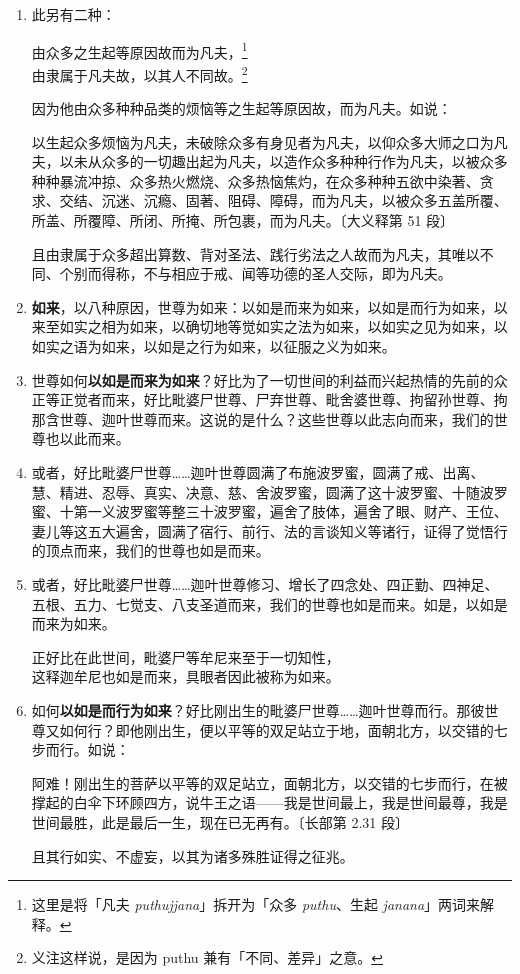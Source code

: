 \begin{enumerate}
\item 此另有二种：\begin{quoting}由众多之生起等原因故而为凡夫，\footnote{这里是将「凡夫 \textit{puthujjana}」拆开为「众多 \textit{puthu}、生起 \textit{janana}」两词来解释。}\\由隶属于凡夫故，以其人不同故。\footnote{义注这样说，是因为 puthu 兼有「不同、差异」之意。}\end{quoting}因为他由众多种种品类的烦恼等之生起等原因故，而为凡夫。如说：\begin{quoting}以生起众多烦恼为凡夫，未破除众多有身见者为凡夫，以仰众多大师之口为凡夫，以未从众多的一切趣出起为凡夫，以造作众多种种行作为凡夫，以被众多种种暴流冲掠、众多热火燃烧、众多热恼焦灼，在众多种种五欲中染著、贪求、交结、沉迷、沉瘾、固著、阻碍、障碍，而为凡夫，以被众多五盖所覆、所盖、所覆障、所闭、所掩、所包裹，而为凡夫。{\bluefootnotesize 〔大义释第 51 段〕}\end{quoting}且由隶属于众多超出算数、背对圣法、践行劣法之人故而为凡夫，其唯以不同、个别而得称，不与相应于戒、闻等功德的圣人交际，即为凡夫。
\item \textbf{如来}，以八种原因，世尊为如来：以如是而来为如来，以如是而行为如来，以来至如实之相为如来，以确切地等觉如实之法为如来，以如实之见为如来，以如实之语为如来，以如是之行为如来，以征服之义为如来。
\item 世尊如何\textbf{以如是而来为如来}？好比为了一切世间的利益而兴起热情的先前的众正等正觉者而来，好比毗婆尸世尊、尸弃世尊、毗舍婆世尊、拘留孙世尊、拘那含世尊、迦叶世尊而来。这说的是什么？这些世尊以此志向而来，我们的世尊也以此而来。
\item 或者，好比毗婆尸世尊……迦叶世尊圆满了布施波罗蜜，圆满了戒、出离、慧、精进、忍辱、真实、决意、慈、舍波罗蜜，圆满了这十波罗蜜、十随波罗蜜、十第一义波罗蜜等整三十波罗蜜，遍舍了肢体，遍舍了眼、财产、王位、妻儿等这五大遍舍，圆满了宿行、前行、法的言谈知义等诸行，证得了觉悟行的顶点而来，我们的世尊也如是而来。
\item 或者，好比毗婆尸世尊……迦叶世尊修习、增长了四念处、四正勤、四神足、五根、五力、七觉支、八支圣道而来，我们的世尊也如是而来。如是，以如是而来为如来。\begin{quoting}正好比在此世间，毗婆尸等牟尼来至于一切知性，\\这释迦牟尼也如是而来，具眼者因此被称为如来。\end{quoting}
\item 如何\textbf{以如是而行为如来}？好比刚出生的毗婆尸世尊……迦叶世尊而行。那彼世尊又如何行？即他刚出生，便以平等的双足站立于地，面朝北方，以交错的七步而行。如说：\begin{quoting}阿难！刚出生的菩萨以平等的双足站立，面朝北方，以交错的七步而行，在被撑起的白伞下环顾四方，说牛王之语——我是世间最上，我是世间最尊，我是世间最胜，此是最后一生，现在已无再有。{\bluefootnotesize 〔长部第 2.31 段〕}\end{quoting}且其行如实、不虚妄，以其为诸多殊胜证得之征兆。

\end{enumerate}
